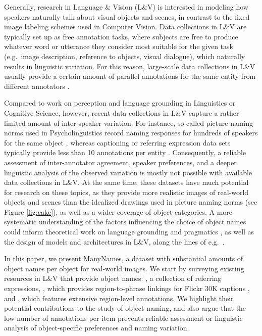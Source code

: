 Generally, research in Language \& Vision (L\&V) is interested in modeling how speakers naturally talk about visual objects and scenes, in contrast to the fixed image labeling schemes used in Computer Vision.
Data collections in L\&V are typically set up as free annotation tasks,  where subjects are free to produce whatever word or utterance they consider most suitable for the given task (e.g.\ image description, reference to objects, visual dialogue), which naturally results in linguistic variation.
For this reason, large-scale data collections in L\&V usually provide a certain amount of parallel annotations for the same entity from different annotators \cite{fangetal:2015,devlin:imcaqui,Kazemzadeh2014,mao15,vries2017guesswhat}.

Compared to work on perception and language grounding in Linguistics or Cognitive Science, however, recent data collections in L\&V capture a rather limited amount of inter-speaker variation.
For instance, so-called picture naming norms used in Psycholinguistics record naming responses for hundreds of speakers for the same object  \cite{snodgrass,rossion2004revisiting}, whereas captioning or referring expression data sets typically provide less than 10 annotations per entity \cite{devlin:imcaqui,Kazemzadeh2014,mao15}.
Consequently, a reliable assessment of inter-annotator agreement, speaker preferences, and a deeper linguistic analysis of the observed variation is mostly not possible with available data collections in  L\&V.
At the same time, these datasets have much potential for research on these topics, as they provide more realistic images of real-world objects and scenes than the idealized drawings used in picture naming norms (see Figure \ref{fig:cake}), as well as a wider coverage of object categories.
A more systematic understanding of the factors influencing the choice of object names could inform theoretical work on language grounding and pragmatics \cite{rohde2012communicating,graf2016animal}, as well as the design of models and architectures in L\&V, along the lines of e.g.\ \cite{lazaridou-dinu-baroni:2015:ACL-IJCNLP,Ordonez:2016,zhao2017open}.

In this paper, we present ManyNames, a dataset with substantial amounts of object names per object for real-world images.
We start by surveying existing resources in L\&V that provide object names:  \cite{Yu2016}, a collection of referring expressions, \flickr \cite{plummer2015flickr30kentities}, which provides region-to-phrase linkings for Flickr 30K captions \cite{young:2014}, and \vgenome \cite{krishna2016visualgenome}, which features extensive region-level annotations. We highlight their potential contributions to the study of object naming, and also argue that the low number of annotations per item prevents reliable assessment or linguistic analysis of object-specific preferences and naming variation.

